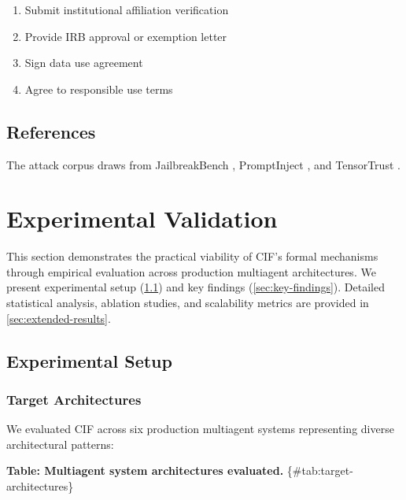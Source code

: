 \documentclass[
]{article}
\begin{document}
\begin{enumerate}
\item Submit institutional affiliation verification
\item Provide IRB approval or exemption letter
\item Sign data use agreement
\item Agree to responsible use terms
\end{enumerate}

\subsection{References}\label{sec:corpus-references}

The attack corpus draws from JailbreakBench
\cite{chao2024jailbreakbench}, PromptInject \cite{liu2023prompt}, and
TensorTrust \cite{toyer2024tensortrust}.

\newpage

\newpage

\section{Experimental Validation}\label{sec:results}

This section demonstrates the practical viability of CIF's formal
mechanisms through empirical evaluation across production multiagent
architectures. We present experimental setup (\cref{sec:exp-setup}) and
key findings (\cref{sec:key-findings}). Detailed statistical analysis,
ablation studies, and scalability metrics are provided in
\cref{sec:extended-results}.

\subsection{Experimental Setup}\label{sec:exp-setup}

\subsubsection{Target Architectures}\label{target-architectures}

We evaluated CIF across six production multiagent systems representing
diverse architectural patterns:

\textbf{Table: Multiagent system architectures evaluated.}
\{\#tab:target-architectures\}
\end{document}
